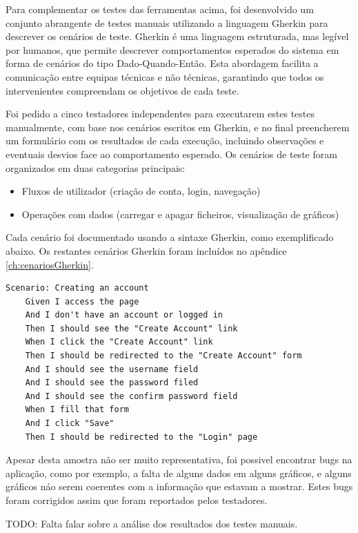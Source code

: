 Para complementar os testes das ferramentas acima, foi desenvolvido um conjunto abrangente de testes manuais utilizando a linguagem Gherkin para descrever os cenários de teste. Gherkin é uma linguagem estruturada, mas legível por humanos, que permite descrever comportamentos esperados do sistema em forma de cenários do tipo Dado-Quando-Então. Esta abordagem facilita a comunicação entre equipas técnicas e não técnicas, garantindo que todos os intervenientes compreendam os objetivos de cada teste.

Foi pedido a cinco testadores independentes para executarem estes testes manualmente, com base nos cenários escritos em Gherkin, e no final preencherem um formulário com os resultados de cada execução, incluindo observações e eventuais desvios face ao comportamento esperado. Os cenários de teste foram organizados em duas categorias principais:

\begin{itemize}
    \item Fluxos de utilizador (criação de conta, login, navegação)
    \item Operações com dados (carregar e apagar ficheiros, visualização de gráficos)
\end{itemize}

Cada cenário foi documentado usando a sintaxe Gherkin, como exemplificado abaixo. Os restantes cenários Gherkin foram incluídos no apêndice \ref{ch:cenariosGherkin}.

\begin{lstlisting}[language=Gherkin, caption={Excerto do código Gherkin do cenário de teste para a criação de uma conta}]
Scenario: Creating an account
	Given I access the page 
	And I don't have an account or logged in
	Then I should see the "Create Account" link
	When I click the "Create Account" link
	Then I should be redirected to the "Create Account" form
	And I should see the username field
	And I should see the password filed
	And I should see the confirm password field
	When I fill that form
	And I click "Save"
	Then I should be redirected to the "Login" page
\end{lstlisting}

Apesar desta amostra não ser muito representativa, foi possivel encontrar bugs na aplicação, como por exemplo, a falta de alguns dados em alguns gráficos, e alguns gráficos náo serem coerentes com a informação que estavam a mostrar. Estes bugs foram corrigidos assim que foram reportados pelos testadores.

TODO: Falta falar sobre a análise dos resultados dos testes manuais.

